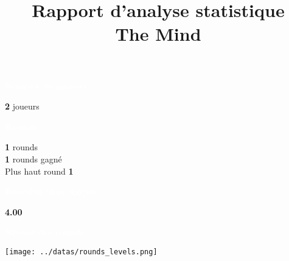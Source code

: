 \documentclass[a4paper,11pt,landscape]{article}
\title{\vspace{-1cm}\Huge \textbf{Rapport d'analyse statistique} \\ \Large The Mind\vspace{-1cm}}
\date{}
\begin{document}
\color{white}
\maketitle
\begin{multicols}{2} %
    \noindent
    \begin{tcolorbox}[colback=ora2,colframe=ora2]
        \begin{tcolorbox}[colback=ora1,colframe=ora1]
            \centering \textcolor{white}{\textbf{Nombre de joueurs}}
        \end{tcolorbox}
    \centering \textbf{
2
    } joueurs
    \begin{tcolorbox}[colback=ora1,colframe=ora1]
        \centering \textcolor{white}{\textbf{Rounds}}
    \end{tcolorbox}
        \centering \textbf{
1
        } rounds \\
        \centering \textbf{
1
        } rounds gagné \\
        \centering Plus haut round \textbf{
1
        }

    \begin{tcolorbox}[colback=ora1,colframe=ora1]
        \centering \textcolor{white}{\textbf{Reaction time moyen}}
    \end{tcolorbox}
     \centering \textbf{
4.00
        }

    \end{tcolorbox}

    \vfill

    \noindent
    \begin{tcolorbox}[colback=ora2,colframe=ora2]
        \begin{tcolorbox}[colback=ora1,colframe=ora1]
            \centering \textcolor{white}{\textbf{Niveau des rounds}}
        \end{tcolorbox}
            \centering \texttt{[image: ../datas/rounds\_levels.png]}


    \end{tcolorbox}
    \vfill
\end{multicols}
\end{document}
